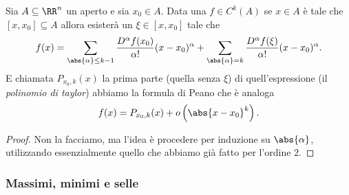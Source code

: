 \documentclass[11pt]{scrartcl}
\begin{document}
	\begin{theorem}
		Sia $A\subseteq\RR^n$ un aperto e sia $x_0\in A$. Data una $f\in C^k(A)$ se $x\in A$ è tale che $[x,x_0]\subseteq A$ allora esisterà un $\xi\in [x,x_0]$ tale che
		$$f(x)=\sum_{\abs{\alpha}\le k-1}\frac{D^\alpha f(x_0)}{\alpha !}(x-x_0)^\alpha +\sum_{\abs{\alpha}=k}\frac{D^\alpha f(\xi)}{\alpha !}(x-x_0)^\alpha.$$
		E chiamata $P_{x_0,k}(x)$ la prima parte (quella senza $\xi$) di quell'espressione (il \textit{polinomio di taylor}) abbiamo la formula di Peano che è analoga
		$$f(x)=P_{x_0,k}(x)+o\left(\abs{x-x_0}^k\right).$$
	\end{theorem}
	\begin{proof}
		Non la facciamo, ma l'idea è procedere per induzione su $\abs{\alpha}$, utilizzando essenzialmente quello che abbiamo già fatto per l'ordine $2$.
	\end{proof}
	
	\subsubsection{Massimi, minimi e selle}
	
\end{document}
